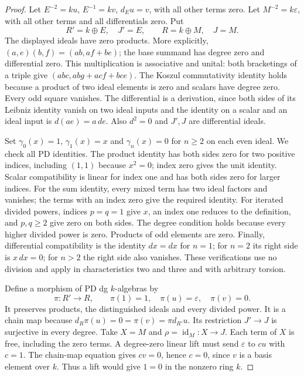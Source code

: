 \begin{proof}
Let $E^{-2}=ku$, $E^{-1}=kv$, $d_Eu=v$, with all other terms zero.
Let $M^{-2}=k\varepsilon$, with all other terms and all differentials zero.
Put
\[
R'=k\oplus E,\quad J'=E,\qquad R=k\oplus M,\quad J=M.
\]
The displayed ideals have zero products.  More explicitly,
$(a,e)(b,f)=(ab,af+be)$; the base summand has degree zero and differential
zero.  This multiplication is associative and unital: both bracketings of
a triple give $(abc,abg+acf+bce)$.  The Koszul commutativity identity holds
because a product of two ideal elements is zero and scalars have degree
zero.  Every odd square vanishes.  The differential is a derivation,
since both sides of its Leibniz identity vanish on two ideal inputs and
the identity on a scalar and an ideal input is $d(ae)=a\,de$.
Also $d^2=0$ and $J',J$ are differential ideals.

Set $\gamma_0(x)=1$, $\gamma_1(x)=x$ and $\gamma_n(x)=0$ for $n\geq2$
on each even ideal.  We check all PD identities.  The product identity
has both sides zero for two positive indices, including $(1,1)$ because
$x^2=0$; index zero gives the unit identity.  Scalar compatibility is
linear for index one and has both sides zero for larger indices.
For the sum identity, every mixed term has two ideal factors and vanishes;
the terms with an index zero give the required identity.  For iterated
divided powers, indices $p=q=1$ give $x$, an index one reduces to the
definition, and $p,q\geq2$ give zero on both sides.  The degree condition
holds because every higher divided power is zero.  Products of odd
elements are zero.  Finally, differential compatibility is the identity
$dx=dx$ for $n=1$; for $n=2$ its right side is $x\,dx=0$; for $n>2$
the right side also vanishes.  These verifications use no division and
apply in characteristics two and three and with arbitrary torsion.

Define a morphism of PD dg $k$-algebras by
\[
\pi:R'\longrightarrow R,\qquad
\pi(1)=1,\quad\pi(u)=\varepsilon,\quad\pi(v)=0.
                                                               \tag{B.2}
\]
It preserves products, the distinguished ideals and every divided power.
It is a chain map because $d_R\pi(u)=0=\pi(v)=\pi d_{R'}u$.
Its restriction $J'\to J$ is surjective in every degree.
Take $X=M$ and $\rho=\operatorname{id}_M:X\to J$.
Each term of $X$ is free, including the zero terms.
A degree-zero linear lift must send $\varepsilon$ to $cu$ with $c=1$.
The chain-map equation gives $cv=0$, hence $c=0$, since $v$ is a basis
element over $k$.  Thus a lift would give $1=0$ in the nonzero ring $k$.


\end{proof}
